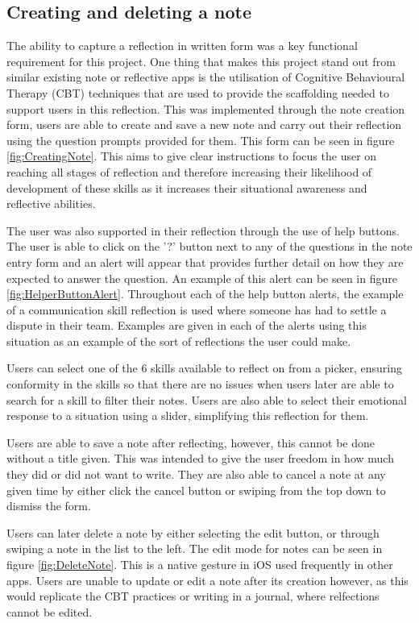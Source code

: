 \documentclass{l4proj}
\begin{document}
\subsection{Creating and deleting a note}

The ability to capture a reflection in written form was a key functional requirement for this project. One thing that makes this project stand out from similar existing note or reflective apps is the utilisation of Cognitive Behavioural Therapy (CBT) techniques that are used to provide the scaffolding needed to support users in this reflection. This was implemented through the note creation form, users are able to create and save a new note and carry out their reflection using the question prompts provided for them. This form can be seen in figure \ref{fig:CreatingNote}. This aims to give clear instructions to focus the user on reaching all stages of reflection and therefore increasing their likelihood of development of these skills as it increases their situational awareness and reflective abilities. 

The user was also supported in their reflection through the use of help buttons. The user is able to click on the '?' button next to any of the questions in the note entry form and an alert will appear that provides further detail on how they are expected to answer the question. An example of this alert can be seen in figure \ref{fig:HelperButtonAlert}. Throughout each of the help button alerts, the example of a communication skill reflection is used where someone has had to settle a dispute in their team. Examples are given in each of the alerts using this situation as an example of the sort of reflections the user could make.

Users can select one of the 6 skills available to reflect on from a picker, ensuring conformity in the skills so that there are no issues when users later are
able to search for a skill to filter their notes. Users are also able to select their emotional response to a situation using a slider, simplifying this
reflection for them. 

Users are able to save a note after reflecting, however, this cannot be done without a title given. This was intended to give the user freedom in how much they did or did not want to write. They are also able to cancel a note at any given time by either click the cancel button or swiping from the top down to dismiss the form. 

Users can later delete a note by either selecting the edit button, or through swiping a note in the list to the left. The edit mode for notes can be seen in figure \ref{fig:DeleteNote}. This is a native gesture in iOS used frequently in other apps. Users are unable to update or edit a note after its creation however, as this would replicate the CBT practices or writing in a journal, where relfections cannot be edited. 
\end{document}
